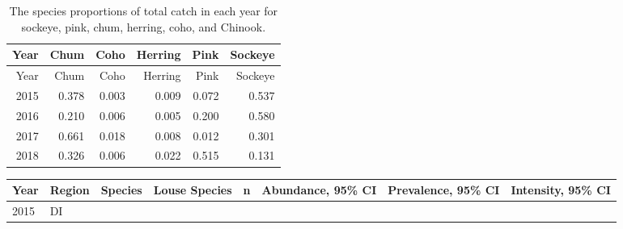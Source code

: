 \documentclass[fleqn,10pt]{wlpeerj} %
\begin{document}
\begin{longtable}[]{@{}rrrrrr@{}}
\caption{\label{tab:proportion-table} The species proportions of total catch in each year for sockeye, pink, chum, herring, coho, and Chinook.}\tabularnewline
\toprule
Year & Chum & Coho & Herring & Pink & Sockeye\tabularnewline
\midrule
\endfirsthead
\toprule
Year & Chum & Coho & Herring & Pink & Sockeye\tabularnewline
\midrule
\endhead
2015 & 0.378 & 0.003 & 0.009 & 0.072 & 0.537\tabularnewline
2016 & 0.210 & 0.006 & 0.005 & 0.200 & 0.580\tabularnewline
2017 & 0.661 & 0.018 & 0.008 & 0.012 & 0.301\tabularnewline
2018 & 0.326 & 0.006 & 0.022 & 0.515 & 0.131\tabularnewline
\bottomrule
\end{longtable}

\begin{longtable}[]{@{}llllrlll@{}}
\toprule
\begin{minipage}[b]{0.04\columnwidth}\raggedright
Year\strut
\end{minipage} & \begin{minipage}[b]{0.06\columnwidth}\raggedright
Region\strut
\end{minipage} & \begin{minipage}[b]{0.07\columnwidth}\raggedright
Species\strut
\end{minipage} & \begin{minipage}[b]{0.13\columnwidth}\raggedright
Louse Species\strut
\end{minipage} & \begin{minipage}[b]{0.03\columnwidth}\raggedleft
n\strut
\end{minipage} & \begin{minipage}[b]{0.15\columnwidth}\raggedright
Abundance, 95\% CI\strut
\end{minipage} & \begin{minipage}[b]{0.16\columnwidth}\raggedright
Prevalence, 95\% CI\strut
\end{minipage} & \begin{minipage}[b]{0.15\columnwidth}\raggedright
Intensity, 95\% CI\strut
\end{minipage}\tabularnewline
\midrule
\endhead
\begin{minipage}[t]{0.04\columnwidth}\raggedright
2015\strut
\end{minipage} & \begin{minipage}[t]{0.06\columnwidth}\raggedright
DI\strut
\end{minipage} & \begin{minipage}[t]{0.07\columnwidth}\raggedright

\end{minipage}
\end{longtable}
\end{document}
